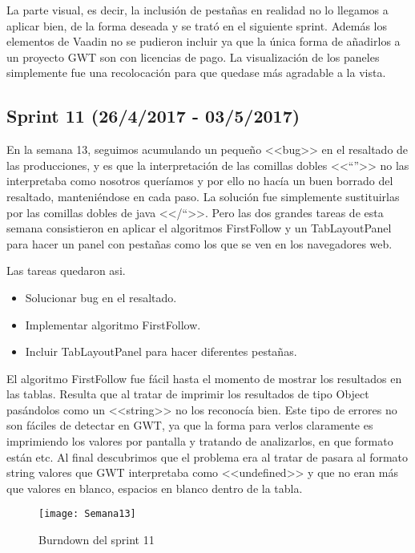La parte visual, es decir, la inclusión de pestañas en realidad no lo llegamos a aplicar bien, de la forma deseada y se trató en el siguiente sprint. Además los elementos de Vaadin no se pudieron incluir ya que la única forma de añadirlos a un proyecto GWT son con licencias de pago. La visualización de los paneles simplemente fue una recolocación para que quedase más agradable a la vista.


\subsection{Sprint 11 (26/4/2017 - 03/5/2017)}

En la semana 13, seguimos acumulando un pequeño <<bug>> en el resaltado de las producciones, y es que la interpretación de las comillas dobles <<``''>> no las interpretaba como nosotros queríamos y por ello no hacía un buen borrado del resaltado, manteniéndose en cada paso. La solución fue simplemente sustituirlas por las comillas dobles de java <</``>>. Pero las dos grandes tareas de esta semana consistieron en aplicar el algoritmos FirstFollow y un TabLayoutPanel para hacer un panel con pestañas como los que se ven en los navegadores web.

Las tareas quedaron asi.

\begin{itemize}
\item Solucionar bug en el resaltado.
\item Implementar algoritmo FirstFollow.
\item Incluir TabLayoutPanel para hacer diferentes pestañas.
\end{itemize}

El algoritmo FirstFollow fue fácil hasta el momento de mostrar los resultados en las tablas. Resulta que al tratar de imprimir los resultados de tipo Object pasándolos como un <<string>> no los reconocía bien. Este tipo de errores no son fáciles de detectar en GWT, ya que la forma para verlos claramente es imprimiendo los valores por pantalla y tratando de analizarlos, en que formato están etc. Al final descubrimos que el problema era al tratar de pasara al formato string valores que GWT interpretaba como <<undefined>> y que no eran más que valores en blanco, espacios en blanco dentro de la tabla. 

\begin{figure}[h]
\centering
\texttt{[image: Semana13]}
\caption{Burndown del sprint 11}
\label{fig:A.2.6}
\end{figure}

